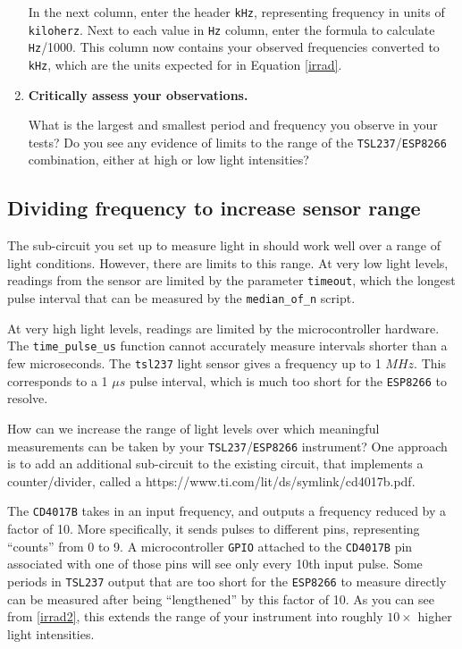 \begin{enumerate}[resume]
	\smallskip
	In the next column, enter the header \texttt{kHz}, representing frequency in units of \texttt{kiloherz}.
	Next to each value in \texttt{Hz} column, enter the formula to calculate \texttt{Hz}/1000.
	This column now contains your observed frequencies converted to \texttt{kHz}, which are the units expected for in Equation \ref{irrad}.

	\item \textbf{Critically assess your observations.}

	What is the largest and smallest period and frequency you observe in your tests?
	Do you see any evidence of limits to the range of the \texttt{TSL237}/\texttt{ESP8266} combination, either at high or low light intensities?
\end{enumerate}


\subsection{Dividing frequency to increase sensor range}
The sub-circuit you set up to measure light in  should work well over a range of light conditions.
However, there are limits to this range.
At very low light levels, readings from the sensor are limited by the parameter \texttt{timeout}, which the longest pulse interval that can be measured by the \lstinline{median_of_n} script.

At very high light levels, readings are limited by the microcontroller hardware.
The \lstinline{time_pulse_us} function cannot accurately measure intervals shorter than a few microseconds.
The \texttt{tsl237} light sensor gives a frequency up to 1 $MHz$.
This corresponds to a 1 $\mu s$ pulse interval, which is much too short for the \texttt{ESP8266} to resolve.

How can we increase the range of light levels over which meaningful measurements can be taken by your \texttt{TSL237}/\texttt{ESP8266} instrument?
One approach is to add an additional sub-circuit to the existing circuit, that implements a counter/divider, called a  {https://www.ti.com/lit/ds/symlink/cd4017b.pdf}.

The \texttt{CD4017B} takes in an input frequency, and outputs a frequency reduced by a factor of 10.
More specifically, it sends pulses to different pins, representing ``counts'' from 0 to 9.
A microcontroller \texttt{GPIO} attached to the \texttt{CD4017B} pin associated with one of those pins will see only every 10th input pulse.
Some periods in \texttt{TSL237} output that are too short for the \texttt{ESP8266} to measure directly can be measured after being ``lengthened'' by  this factor of 10.
As you can see from \ref{irrad2}, this extends the range of your instrument into roughly $10\times$ higher light intensities.

